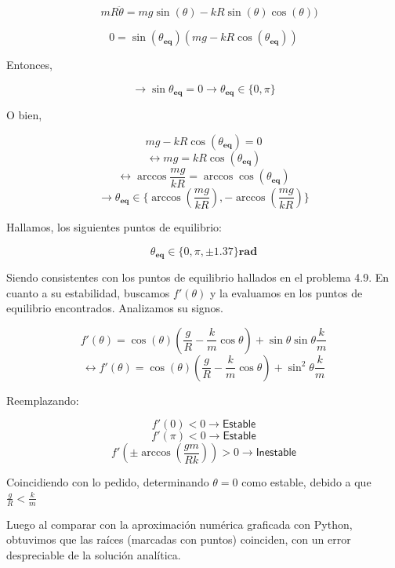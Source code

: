 \documentclass{article}
\begin{document}
   	 
   	$$
   	\quad mR\ddot{\theta} = mg \sin{(\theta)} - kR \sin{(\theta)} \cos{(\theta)})
   	$$
   	 
   	$$
   	0 = \sin{(\theta_{\textbf{eq}})} (mg - kR \cos{(\theta_{\textbf{eq}})})
   	$$
   	 
   	Entonces,
   	 
   	 $$\rightarrow \sin{\theta_{\textbf{eq}}} = 0 \rightarrow \theta_{\textbf{eq}} \in \lbrace 0, \pi \rbrace $$
   	 
   	O bien,
   	 
   	$$
		mg - kR \cos{(\theta_{\textbf{eq}})} = 0 
	$$
	$$
		\leftrightarrow mg = kR \cos{(\theta_{\textbf{eq}})} 
   	$$
   	$$
		\leftrightarrow \arccos{\frac{mg}{kR}} = \arccos{\cos{(\theta_{\textbf{eq}})}} 
   	$$
   	$$
		\rightarrow \theta_{\textbf{eq}} \in \lbrace \arccos{(\frac{mg}{kR})}, -\arccos{(\frac{mg}{kR})} \rbrace 
   	$$

	Hallamos, los siguientes puntos de equilibrio:
	
	$$\theta_{\textbf{eq}} \in \lbrace 0, \pi, \pm1.37 \rbrace \textbf{rad}$$
	
	Siendo consistentes con los puntos de equilibrio hallados en el problema 4.9. En cuanto a su estabilidad, buscamos $f'(\theta)$ y la evaluamos en los puntos de equilibrio encontrados. Analizamos su signos.
	
	$$
		f'(\theta) = \cos{(\theta)} (\frac{g}{R} - \frac{k}{m} \cos{\theta}) + \sin{\theta} \sin{\theta} \frac{k}{m}  
	$$
	$$
		\leftrightarrow f'(\theta) = \cos{(\theta)} (\frac{g}{R} - \frac{k}{m} \cos{\theta}) + \sin^2 {\theta} \frac{k}{m}  
	$$
	
	Reemplazando:
	
	$$f'(0) < 0 \rightarrow \textsf{Estable}$$
	$$f'(\pi) < 0 \rightarrow \textsf{Estable}$$
	$$f'(\pm \arccos{(\frac{gm}{Rk})}) > 0 \rightarrow \textsf{Inestable}$$
	
	Coincidiendo con lo pedido, determinando $\theta = 0$ como estable, debido a que $\frac{g}{R} < \frac{k}{m}$

	Luego al comparar con la aproximaci\'on num\'erica graficada con Python, obtuvimos que las ra\'ices (marcadas con puntos) coinciden, con un error despreciable de la soluci\'on anal\'itica.
	
\end{document}
